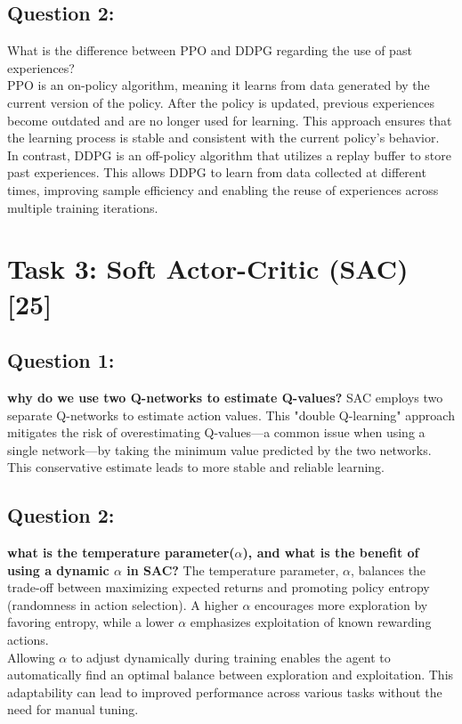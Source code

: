 \documentclass[12pt]{article}
\begin{document}
{{{\vspace*{0.3cm}

\subsection{Question 2:}

What is the difference between PPO and DDPG regarding the use of past experiences?\\
PPO is an on-policy algorithm, meaning it learns from data generated by the current version of the policy. After the policy is updated, previous experiences become outdated and are no longer used for learning. This approach ensures that the learning process is stable and consistent with the current policy's behavior. \\
In contrast, DDPG is an off-policy algorithm that utilizes a replay buffer to store past experiences. This allows DDPG to learn from data collected at different times, improving sample efficiency and enabling the reuse of experiences across multiple training iterations.

\newpage

\section{Task 3: Soft Actor-Critic (SAC) [25]}

\subsection{Question 1:}
\textbf{why do we use two Q-networks to estimate Q-values?}
\newline
SAC employs two separate Q-networks to estimate action values. This "double Q-learning" approach mitigates the risk of overestimating Q-values—a common issue when using a single network—by taking the minimum value predicted by the two networks. This conservative estimate leads to more stable and reliable learning. 


\vspace*{0.3cm}

\subsection{Question 2:}
\textbf{what is the temperature parameter($\alpha$), and what is the benefit of using a dynamic $\alpha$ in SAC?}
\newline
The temperature parameter, $\alpha$, balances the trade-off between maximizing expected returns and promoting policy entropy (randomness in action selection). A higher $\alpha$ encourages more exploration by favoring entropy, while a lower $\alpha$ emphasizes exploitation of known rewarding actions.\\
Allowing $\alpha$ to adjust dynamically during training enables the agent to automatically find an optimal balance between exploration and exploitation. This adaptability can lead to improved performance across various tasks without the need for manual tuning.


}}}
\end{document}
